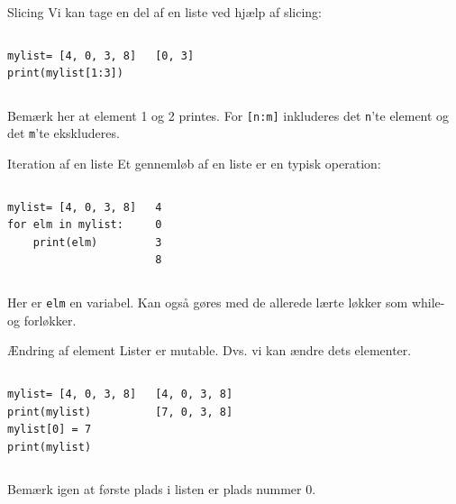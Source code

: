 \begin{frame}[fragile]{Slicing}
	Vi kan tage en del af en liste ved hjælp af slicing:
	\begin{columns}
		\begin{lstlisting}[style=python]
mylist= [4, 0, 3, 8]
print(mylist[1:3])
		\end{lstlisting}
		\pause
		\begin{lstlisting}[style=python]
[0, 3]
		\end{lstlisting}
	\end{columns}
	Bemærk her at element 1 og 2 printes. For \texttt{[n:m]} inkluderes det \texttt{n}'te element og det \texttt{m}'te ekskluderes.
\end{frame}


\begin{frame}[fragile]{Iteration af en liste}
	Et gennemløb af en liste er en typisk operation:
	\begin{columns}
		\column{0.4\textwidth}
		\begin{lstlisting}[style=python]
mylist= [4, 0, 3, 8]
for elm in mylist:
	print(elm)
		\end{lstlisting}
		\column{0.4\textwidth}
		\begin{lstlisting}[style=python]
4
0
3
8
		\end{lstlisting}
	\end{columns}
	Her er \texttt{elm} en variabel. Kan også gøres med de allerede lærte løkker som while- og forløkker.
\end{frame}

\begin{frame}[fragile]{Ændring af element}
	Lister er mutable. Dvs. vi kan ændre dets elementer.
	\begin{columns}
		\begin{lstlisting}[style=python]
mylist= [4, 0, 3, 8]
print(mylist)
mylist[0] = 7
print(mylist)
		\end{lstlisting}
		\begin{lstlisting}[style=python]
[4, 0, 3, 8]
[7, 0, 3, 8]
		\end{lstlisting}
	\end{columns}
	Bemærk igen at første plads i listen er plads nummer 0.
\end{frame}


